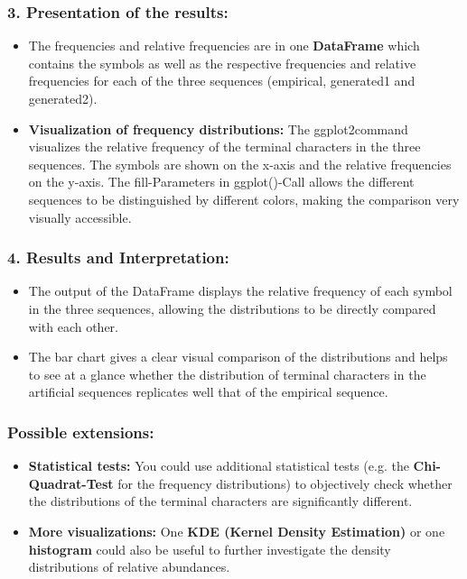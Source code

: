 \documentclass[
]{article}
\begin{document}
\subsubsection{\texorpdfstring{\textbf{3. Presentation of the
results:}}{3. Presentation of the results:}}\label{presentation-of-the-results}

\begin{itemize}
\item
  The frequencies and relative frequencies are in one \textbf{DataFrame}
  which contains the symbols as well as the respective frequencies and
  relative frequencies for each of the three sequences (empirical,
  generated1 and generated2).
\item
  \textbf{Visualization of frequency distributions:} The ggplot2command
  visualizes the relative frequency of the terminal characters in the
  three sequences. The symbols are shown on the x-axis and the relative
  frequencies on the y-axis. The fill-Parameters in ggplot()-Call allows
  the different sequences to be distinguished by different colors,
  making the comparison very visually accessible.
\end{itemize}

\subsubsection{\texorpdfstring{\textbf{4. Results and
Interpretation:}}{4. Results and Interpretation:}}\label{results-and-interpretation}

\begin{itemize}
\item
  The output of the DataFrame displays the relative frequency of each
  symbol in the three sequences, allowing the distributions to be
  directly compared with each other.
\item
  The bar chart gives a clear visual comparison of the distributions and
  helps to see at a glance whether the distribution of terminal
  characters in the artificial sequences replicates well that of the
  empirical sequence.
\end{itemize}

\subsubsection{\texorpdfstring{\textbf{Possible
extensions:}}{Possible extensions:}}\label{possible-extensions}

\begin{itemize}
\item
  \textbf{Statistical tests:} You could use additional statistical tests
  (e.g. the \textbf{Chi-Quadrat-Test} for the frequency distributions)
  to objectively check whether the distributions of the terminal
  characters are significantly different.
\item
  \textbf{More visualizations:} One \textbf{KDE (Kernel Density
  Estimation)} or one \textbf{histogram} could also be useful to further
  investigate the density distributions of relative abundances.
\end{itemize}
\end{document}

